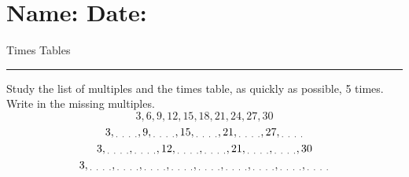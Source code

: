 \documentclass[12pt]{article}
\def \Heading {\section*{\Large Name: \underline{\hspace{8cm}} \hfill Date: \underline{\hspace{3cm}}} \vspace{-3mm}
{Times Tables} \vspace{1pt}\hrule}
\begin{document}
\Heading

\vspace{5mm}
\Large %

Study the list of multiples and the times table, as quickly as possible, 5 times. \\

Write in the missing multiples.
\[ 3, 6, 9, 12, 15, 18, 21, 24, 27, 30 \]
\[ 3, \textsubscript{. . . .}, 9, \textsubscript{. . . .}, 15, \textsubscript{. . . .}, 21, \textsubscript{. . . .}, 27, \textsubscript{. . . .} \]
\[ 3, \textsubscript{. . . .}, \textsubscript{. . . .}, 12, \textsubscript{. . . .}, \textsubscript{. . . .}, 21, \textsubscript{. . . .}, \textsubscript{. . . .}, 30 \]
\[ 3, \textsubscript{. . . .}, \textsubscript{. . . .}, \textsubscript{. . . .}, \textsubscript{. . . .}, \textsubscript{. . . .}, \textsubscript{. . . .}, \textsubscript{. . . .}, \textsubscript{. . . .}, \textsubscript{. . . .} \]
\end{document}
